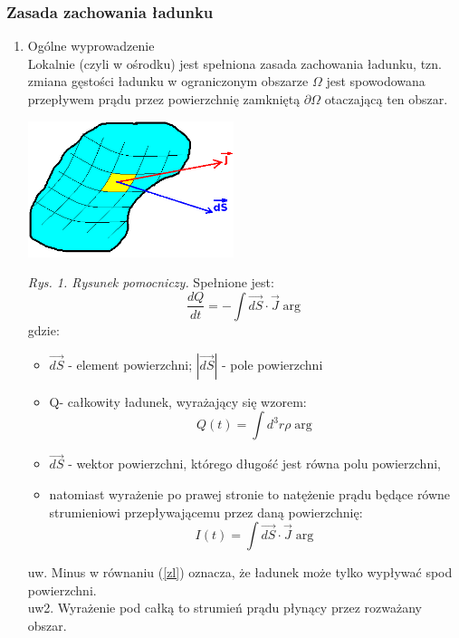 \subsubsection{Zasada zachowania ładunku}
\begin{enumerate}
\item{Ogólne wyprowadzenie}\\
Lokalnie (czyli w ośrodku) jest spełniona zasada zachowania ładunku, tzn. zmiana gęstości ładunku w ograniczonym obszarze $\Omega$ jest spowodowana przepływem prądu przez powierzchnię zamkniętą $\partial\Omega$ otaczającą ten obszar.
\begin{center}
\includegraphics[width=6cm] {obrazki/obrazek1}
\end{center}
\textit{Rys. 1. Rysunek pomocniczy.}
Spełnione jest:
\begin{equation}
\frac{dQ}{dt}=-\int \vec{dS}\cdot\vec{J}\arg \label{zl}
\end{equation}
gdzie: 
\begin{itemize}
\item $\vec{dS}$ - element powierzchni; $|\vec{dS}|$ - pole powierzchni
\item Q- całkowity ładunek, wyrażający się wzorem:
\begin{equation}Q(t)=\int d^3r \rho\arg \label{Q} \end{equation}
\item $\vec{dS}$  - wektor powierzchni, którego długość jest równa polu powierzchni, 
\item natomiast wyrażenie po prawej stronie to natężenie prądu będące równe strumieniowi przepływającemu przez daną powierzchnię:
\begin{equation}
I(t)=\int \vec{dS}\cdot\vec{J}\arg 
\end{equation}
\end{itemize}
uw. Minus w równaniu (\ref{zl}) oznacza, że ładunek może tylko wypływać spod powierzchni.\\
uw2. Wyrażenie pod całką to strumień prądu płynący przez rozważany obszar.


\end{enumerate}
